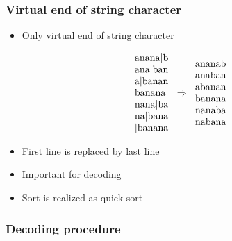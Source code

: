 \begin{frame}
	\frametitle{Virtual end of string character}
	\begin{itemize}
		\item Only virtual end of string character
	\end{itemize}
	\begin{displaymath}
		\begin{tabular}{c}
		anana|b\\
		ana|ban\\
		a|banan\\
		banana|\\
		nana|ba\\
		na|bana\\
		|banana
		\end{tabular}
		\Rightarrow
		\begin{tabular}{c}
		ananab\\
		anaban\\
		abanan\\
		banana\\
		nanaba\\
		nabana
		\end{tabular}
	\end{displaymath}
	\begin{itemize}
		\item First line is replaced by last line
		\item Important for decoding
		\item Sort is realized as quick sort
	\end{itemize}
\end{frame}

\begin{frame}
	\frametitle{Decoding procedure}
	
\end{frame}
